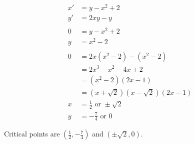 \documentclass{article}
\begin{document}
\begin{align*}
  x' & = y - x^2 + 2                             \\
  y' & = 2 x y - y                               \\ \\
  0  & = y - x^2 + 2                             \\
  y  & = x^2 - 2                                 \\ \\
  0  & = 2 x (x^2 - 2) - (x^2 - 2)               \\
     & = 2 x^3 - x^2 - 4 x + 2                   \\
     & = (x^2 - 2) (2 x - 1)                     \\
     & = (x + \sqrt{2}) (x - \sqrt{2}) (2 x - 1) \\
  x  & = \frac{1}{2} \text{ or } \pm \sqrt{2}    \\
  y  & = -\frac{7}{4} \text{ or } 0
\end{align*}

Critical points are $\left( \frac{1}{2}, -\frac{7}{4} \right)$ and $(\pm \sqrt{2}, 0)$.
\end{document}
